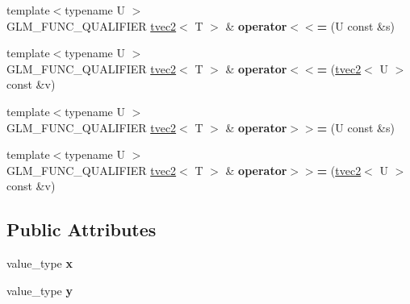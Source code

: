 \begin{DoxyCompactItemize}
\item 
\hypertarget{structglm_1_1detail_1_1tvec2_a74dc748454e218375e4b9648bdc679b8}{{\footnotesize template$<$typename U $>$ }\\G\-L\-M\-\_\-\-F\-U\-N\-C\-\_\-\-Q\-U\-A\-L\-I\-F\-I\-E\-R \hyperlink{structglm_1_1detail_1_1tvec2}{tvec2}$<$ T $>$ \& {\bfseries operator$<$$<$=} (U const \&s)}\label{structglm_1_1detail_1_1tvec2_a74dc748454e218375e4b9648bdc679b8}

\item 
\hypertarget{structglm_1_1detail_1_1tvec2_a9e883185f2abdb202660eecc3158cf1f}{{\footnotesize template$<$typename U $>$ }\\G\-L\-M\-\_\-\-F\-U\-N\-C\-\_\-\-Q\-U\-A\-L\-I\-F\-I\-E\-R \hyperlink{structglm_1_1detail_1_1tvec2}{tvec2}$<$ T $>$ \& {\bfseries operator$<$$<$=} (\hyperlink{structglm_1_1detail_1_1tvec2}{tvec2}$<$ U $>$ const \&v)}\label{structglm_1_1detail_1_1tvec2_a9e883185f2abdb202660eecc3158cf1f}

\item 
\hypertarget{structglm_1_1detail_1_1tvec2_a9f7cce4a01cec1735f8fde5c3897722b}{{\footnotesize template$<$typename U $>$ }\\G\-L\-M\-\_\-\-F\-U\-N\-C\-\_\-\-Q\-U\-A\-L\-I\-F\-I\-E\-R \hyperlink{structglm_1_1detail_1_1tvec2}{tvec2}$<$ T $>$ \& {\bfseries operator$>$$>$=} (U const \&s)}\label{structglm_1_1detail_1_1tvec2_a9f7cce4a01cec1735f8fde5c3897722b}

\item 
\hypertarget{structglm_1_1detail_1_1tvec2_a7e19b9f7439ac62aa5d14d947ada96bf}{{\footnotesize template$<$typename U $>$ }\\G\-L\-M\-\_\-\-F\-U\-N\-C\-\_\-\-Q\-U\-A\-L\-I\-F\-I\-E\-R \hyperlink{structglm_1_1detail_1_1tvec2}{tvec2}$<$ T $>$ \& {\bfseries operator$>$$>$=} (\hyperlink{structglm_1_1detail_1_1tvec2}{tvec2}$<$ U $>$ const \&v)}\label{structglm_1_1detail_1_1tvec2_a7e19b9f7439ac62aa5d14d947ada96bf}

\end{DoxyCompactItemize}
\subsection*{Public Attributes}
\begin{DoxyCompactItemize}
\item 
\hypertarget{structglm_1_1detail_1_1tvec2_a966c80effc854e7f27f9438de3a03446}{value\-\_\-type {\bfseries x}}\label{structglm_1_1detail_1_1tvec2_a966c80effc854e7f27f9438de3a03446}

\item 
\hypertarget{structglm_1_1detail_1_1tvec2_a12358d18dae79b668519773f58e5931d}{value\-\_\-type {\bfseries y}}\label{structglm_1_1detail_1_1tvec2_a12358d18dae79b668519773f58e5931d}

\end{DoxyCompactItemize}


